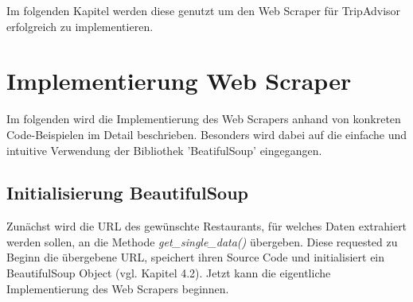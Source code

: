 \documentclass[a4paper,oneside,12pt]{report}
\begin{document}
			Im folgenden Kapitel werden diese genutzt um den Web Scraper für TripAdvisor erfolgreich zu implementieren.
	
	
		\section[Implementierung Web Scraper - Anja Wolf]{Implementierung Web Scraper}
			
			Im folgenden wird die Implementierung des Web Scrapers anhand von konkreten Code-Beispielen im Detail beschrieben. Besonders wird dabei auf die einfache und intuitive Verwendung der Bibliothek 'BeatifulSoup' eingegangen.
	
	
			\subsection[Initialisierung BeautifulSoup - Anja Wolf]{Initialisierung BeautifulSoup}
			
				Zunächst wird die URL des gewünschte Restaurants, für welches Daten extrahiert werden sollen, an die Methode \textit{get\_single\_data()} übergeben. Diese requested zu Beginn die übergebene URL, speichert ihren Source Code und initialisiert ein BeautifulSoup Object (vgl. Kapitel 4.2). Jetzt kann die eigentliche Implementierung des Web Scrapers beginnen. 
	
\end{document}

